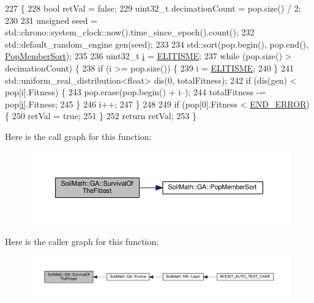 \begin{DoxyCode}
227                                                                     \{
228   \textcolor{keywordtype}{bool} retVal = \textcolor{keyword}{false};
229   uint32\_t decimationCount = pop.size() / 2;
230 
231   \textcolor{keywordtype}{unsigned} seed = std::chrono::system\_clock::now().time\_since\_epoch().count();
232   std::default\_random\_engine gen(seed);
233 
234   std::sort(pop.begin(), pop.end(), \hyperlink{class_soil_math_1_1_g_a_a1e950022fa3ea792a36cbc62f9b8528b}{PopMemberSort});
235 
236   uint32\_t \hyperlink{_comparision_pictures_2_createtest_image_8m_a6f6ccfcf58b31cb6412107d9d5281426}{i} = \hyperlink{_soil_math_types_8h_aa2f6faf3ad4bc7b9d4df4f766203a2ff}{ELITISME};
237   \textcolor{keywordflow}{while} (pop.size() > decimationCount) \{
238     \textcolor{keywordflow}{if} (i >= pop.size()) \{
239       i = \hyperlink{_soil_math_types_8h_aa2f6faf3ad4bc7b9d4df4f766203a2ff}{ELITISME};
240     \}
241     std::uniform\_real\_distribution<float> dis(0, totalFitness);
242     \textcolor{keywordflow}{if} (dis(gen) < pop[i].Fitness) \{
243       pop.erase(pop.begin() + i--);
244       totalFitness -= pop[\hyperlink{_comparision_pictures_2_createtest_image_8m_a6f6ccfcf58b31cb6412107d9d5281426}{i}].Fitness;
245     \}
246     i++;
247   \}
248 
249   \textcolor{keywordflow}{if} (pop[0].Fitness < \hyperlink{_soil_math_types_8h_ae9ddcafe7b5c7bc5956b50623aa31747}{END\_ERROR}) \{
250     retVal = \textcolor{keyword}{true};
251   \}
252   \textcolor{keywordflow}{return} retVal;
253 \}
\end{DoxyCode}


Here is the call graph for this function\+:
\nopagebreak
\begin{figure}[H]
\begin{center}
\leavevmode
\includegraphics[width=350pt]{class_soil_math_1_1_g_a_ac2c10631815408d044738f678c67e98b_cgraph}
\end{center}
\end{figure}




Here is the caller graph for this function\+:
\nopagebreak
\begin{figure}[H]
\begin{center}
\leavevmode
\includegraphics[width=350pt]{class_soil_math_1_1_g_a_ac2c10631815408d044738f678c67e98b_icgraph}
\end{center}
\end{figure}




